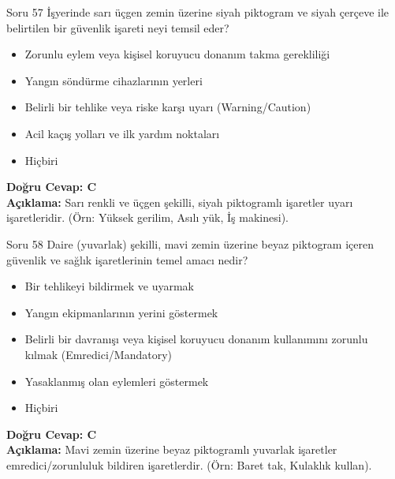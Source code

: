 \documentclass[12pt,a4paper]{article}
\begin{document}
\begin{testcard}{Soru 57}
    İşyerinde sarı üçgen zemin üzerine siyah piktogram ve siyah çerçeve ile belirtilen bir güvenlik işareti neyi temsil eder?
    \begin{itemize}
        \item[A)] Zorunlu eylem veya kişisel koruyucu donanım takma gerekliliği
        \item[B)] Yangın söndürme cihazlarının yerleri
        \item[C)] Belirli bir tehlike veya riske karşı uyarı (Warning/Caution)
        \item[D)] Acil kaçış yolları ve ilk yardım noktaları
        \item[E)] Hiçbiri
    \end{itemize}
    \tcblower
    \textbf{Doğru Cevap: C} \\
    \textbf{Açıklama:} Sarı renkli ve üçgen şekilli, siyah piktogramlı işaretler uyarı işaretleridir. (Örn: Yüksek gerilim, Asılı yük, İş makinesi).
\end{testcard}

\begin{testcard}{Soru 58}
    Daire (yuvarlak) şekilli, mavi zemin üzerine beyaz piktogram içeren güvenlik ve sağlık işaretlerinin temel amacı nedir?
    \begin{itemize}
        \item[A)] Bir tehlikeyi bildirmek ve uyarmak
        \item[B)] Yangın ekipmanlarının yerini göstermek
        \item[C)] Belirli bir davranışı veya kişisel koruyucu donanım kullanımını zorunlu kılmak (Emredici/Mandatory)
        \item[D)] Yasaklanmış olan eylemleri göstermek
        \item[E)] Hiçbiri
    \end{itemize}
    \tcblower
    \textbf{Doğru Cevap: C} \\
    \textbf{Açıklama:} Mavi zemin üzerine beyaz piktogramlı yuvarlak işaretler emredici/zorunluluk bildiren işaretlerdir. (Örn: Baret tak, Kulaklık kullan).
\end{testcard}
\end{document}
